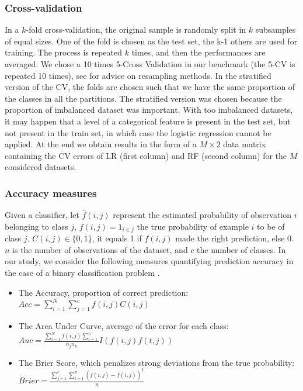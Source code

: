 \documentclass[12pt]{article}
\begin{document}
\subsubsection{Cross-validation}
\label{subsubsec:cv}

In a $k$-fold cross-validation, the original sample is randomly split in $k$ subsamples of equal sizes. One of the fold is chosen as the test set, the k-1 others are used for training. The process is repeated $k$ times, and then the performances are averaged. We chose a 10 times 5-Cross Validation in our benchmark (the 5-CV is repeated 10 times), see \cite{Bischl2012} for advice on resampling methods. In the stratified version of the CV, the folds are chosen such that we have the same proportion of the classes in all the partitions. The stratified version was chosen because the proportion of imbalanced dataset was important. With too imbalanced datasets, it may happen that a level of a categorical feature is present in the test set, but not present in the train set, in which case the logistic regression cannot be applied. At the end we obtain results in the form of a $M\times 2$ data matrix containing the CV errors of LR (first column) and RF (second column) for the $M$ considered datasets.


\subsubsection{Accuracy measures}
Given a classifier, let $\hat{f}(i,j)$ represent the estimated probability of observation $i$ belonging to class $j$, $f(i,j)=1_{i∈j}$ the true probability of example $i$ to be of class $j$. $C(i,j) \in \{0,1\}$, it equals 1 if  $f(i,j)$ made the right prediction, else 0. $n$ is the number of observations of the dataset, and $c$ the number of classes. In our study, we consider the following measures quantifying prediction accuracy in the case of a binary classification problem \citep{ferri2009experimental}.

\begin{itemize}

\item The Accuracy, proportion of correct prediction:  
\\ $Acc =  \sum_{i=1}^N \sum_{j=1}^c f(i,j)C(i,j)$

\item The Area Under Curve, average of the error for each class: 
\\$Auc =  \frac{\sum_{i=1}^N f(i,j) \sum_{t=1}^n}{n_j n_k}   I(f(i,j)f(t,j))$


\item The Brier Score, which penalizes strong deviations from the true probability:
\\ $Brier =  \frac{\sum_{j=1}^c \sum_{i=1}^n (f(i,j)-\hat{f}(i,j))^2} {n}$


\end{itemize}
\end{document}
